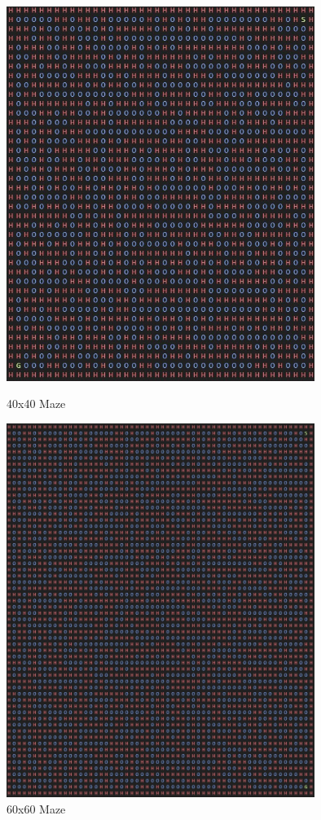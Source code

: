 \documentclass[twoside, 12pt, a4paper]{article}
\begin{document}
\begin{figure}[bp!]
\begin{center}
\includegraphics[width=10cm]{40x40.jpg} 
\caption{\label{tab:table-name}40x40 Maze}

\includegraphics[width=10cm]{60x60.jpg} 
\caption{\label{tab:table-name}60x60 Maze}
\end {center}
\end{figure}
\end{document}
